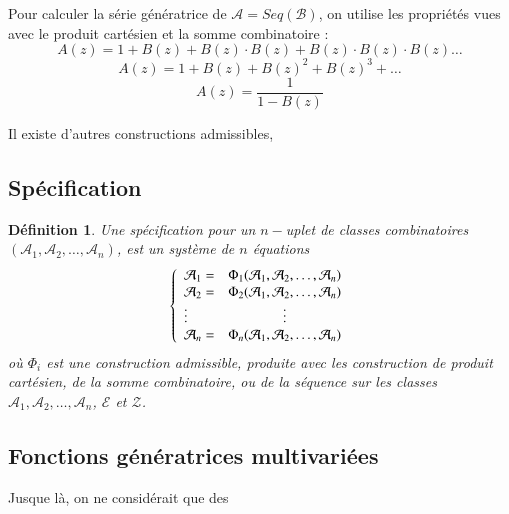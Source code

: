 \documentclass[12pt]{article}
\newtheorem*{definition}{Définition}
\begin{document}
Pour calculer la série génératrice de $\mathcal A = Seq(\mathcal B)$, on utilise les propriétés vues avec le produit cartésien et la somme combinatoire : 
$$A(z) = 1+ B(z)+B(z)\cdot B(z)+B(z)\cdot B(z) \cdot B(z) \dots$$
$$A(z) = 1 + B(z)+B(z)^2+B(z)^3 + \dots $$
$$A(z)= \frac{1}{1-B(z)}$$

Il existe d'autres constructions admissibles, 

\subsection{Spécification}
\begin{definition}
Une spécification pour un $n-$uplet de classes combinatoires $(\mathcal A_1,\mathcal A_2,\dots,\mathcal A_n)$, est un système de $n$ équations
$$\left\{
\begin{array}{l c}
  \mathcal A_1 =& \Phi_1 (\mathcal A_1,\mathcal A_2,\dots, \mathcal A_n)\\
  \mathcal A_2 = & \Phi_2 (\mathcal A_1,\mathcal A_2,\dots, \mathcal A_n)\\
  \vdots & \vdots\\
\mathcal A_n = & \Phi_n (\mathcal A_1,\mathcal A_2,\dots, \mathcal A_n)\\
\end{array}
\right.$$ 
où $\Phi_i$ est une construction admissible, produite avec les construction de produit cartésien, de la somme combinatoire, ou de la séquence sur les classes $\mathcal A_1,\mathcal A_2,\dots, \mathcal A_n$, $\mathcal E$ et $\mathcal Z$.\end{definition}

\subsection{Fonctions génératrices multivariées}
Jusque là, on ne considérait que des
\end{document}
